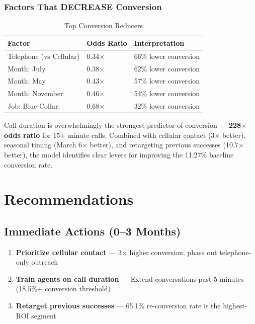 \documentclass[11pt,a4paper]{article}
\begin{document}
\subsubsection{Factors That DECREASE Conversion}

\begin{table}[H]
\centering
\begin{tabular}{p{4.5cm} p{2.5cm} p{4.5cm}}
\toprule
\rowcolor{primary!10}
\textbf{Factor} & \textbf{Odds Ratio} & \textbf{Interpretation} \\
\midrule
\rowcolor{dropred!15}
Telephone (vs Cellular) & 0.34$\times$ & 66\% lower conversion \\
Month: July & 0.38$\times$ & 62\% lower conversion \\
Month: May & 0.43$\times$ & 57\% lower conversion \\
Month: November & 0.46$\times$ & 54\% lower conversion \\
Job: Blue-Collar & 0.68$\times$ & 32\% lower conversion \\
\bottomrule
\end{tabular}
\caption{Top Conversion Reducers}
\end{table}

\begin{tcolorbox}[
    colback=primary!5,
    colframe=primary!50,
    title=\textbf{Statistical Conclusion},
    fonttitle=\bfseries,
    arc=6pt
]
Call duration is overwhelmingly the strongest predictor of conversion — \textbf{228$\times$ odds ratio} for 15+ minute calls. Combined with cellular contact (3$\times$ better), seasonal timing (March 6$\times$ better), and retargeting previous successes (10.7$\times$ better), the model identifies clear levers for improving the 11.27\% baseline conversion rate.
\end{tcolorbox}

\section{Recommendations}

\subsection{Immediate Actions (0--3 Months)}

\begin{enumerate}[label=\color{conversiongreen}\textbf{\theenumi.}, leftmargin=*]
    \item \textbf{Prioritize cellular contact} — 3$\times$ higher conversion; phase out telephone-only outreach
    \item \textbf{Train agents on call duration} — Extend conversations past 5 minutes (18.5\%+ conversion threshold)
    \item \textbf{Retarget previous successes} — 65.1\% re-conversion rate is the highest-ROI segment
\end{enumerate}
\end{document}
